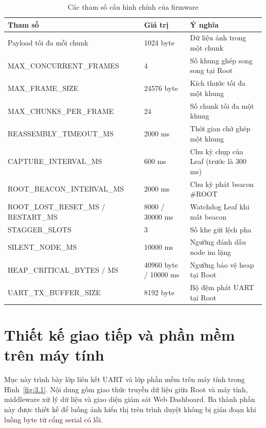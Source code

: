 \begin{table}[!htbp]
\centering
\caption{Các tham số cấu hình chính của firmware}\label{tab:3.4}
{\fontsize{12}{14.5}\selectfont\renewcommand{\arraystretch}{1.25}
\begin{tabular}{|L{5.33cm}|L{3.62cm}|L{5.00cm}|}
\hline
\textbf{Tham số} & \textbf{Giá trị} & \textbf{Ý nghĩa} \\
\hline
Payload tối đa mỗi chunk & 1024 byte & Dữ liệu ảnh trong một chunk \\
\hline
MAX\_\allowbreak{}CONCURRENT\_\allowbreak{}FRAMES & 4 & Số khung ghép song song tại Root \\
\hline
MAX\_\allowbreak{}FRAME\_\allowbreak{}SIZE & 24576 byte & Kích thước tối đa một khung \\
\hline
MAX\_\allowbreak{}CHUNKS\_\allowbreak{}PER\_\allowbreak{}FRAME & 24 & Số chunk tối đa một khung \\
\hline
REASSEMBLY\_\allowbreak{}TIMEOUT\_\allowbreak{}MS & 2000 ms & Thời gian chờ ghép một khung \\
\hline
CAPTURE\_\allowbreak{}INTERVAL\_\allowbreak{}MS & 600 ms & Chu kỳ chụp của Leaf (trước là 300 ms) \\
\hline
ROOT\_\allowbreak{}BEACON\_\allowbreak{}INTERVAL\_\allowbreak{}MS & 2000 ms & Chu kỳ phát beacon \#ROOT \\
\hline
ROOT\_\allowbreak{}LOST\_\allowbreak{}RESET\_\allowbreak{}MS /\allowbreak{} RESTART\_\allowbreak{}MS & 8000 /\allowbreak{} 30000 ms & Watchdog Leaf khi mất beacon \\
\hline
STAGGER\_\allowbreak{}SLOTS & 3 & Số khe gửi lệch pha \\
\hline
SILENT\_\allowbreak{}NODE\_\allowbreak{}MS & 10000 ms & Ngưỡng đánh dấu node im lặng \\
\hline
HEAP\_\allowbreak{}CRITICAL\_\allowbreak{}BYTES /\allowbreak{} MS & 40960 byte /\allowbreak{} 10000 ms & Ngưỡng bảo vệ heap tại Root \\
\hline
UART\_\allowbreak{}TX\_\allowbreak{}BUFFER\_\allowbreak{}SIZE & 8192 byte & Bộ đệm phát UART tại Root \\
\hline
\end{tabular}}
\end{table}


\section{Thiết kế giao tiếp và phần mềm trên máy tính}\label{sec:3.4}

Mục này trình bày lớp liên kết UART và lớp phần mềm trên máy tính trong Hình~\ref{fig:3.1}. Nội dung gồm giao thức truyền dữ liệu giữa Root và máy tính, middleware xử lý dữ liệu và giao diện giám sát Web Dashboard. Ba thành phần này được thiết kế để luồng ảnh hiển thị trên trình duyệt không bị gián đoạn khi luồng byte từ cổng serial có lỗi.

